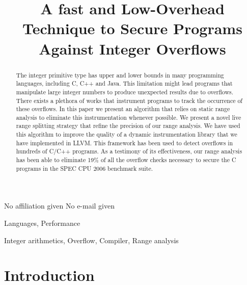 \documentclass[preprint]{sigplanconf}[10pt]
\begin{document}
\copyrightdata{[to be supplied]} 


\title{A fast and Low-Overhead Technique to Secure Programs Against
Integer Overflows}

           {No affiliation given}
           {No e-mail given}

\maketitle

\begin{abstract}
The integer primitive type has upper and lower bounds in many programming
languages, including C, C++ and Java.
This limitation might lead programs that manipulate large integer numbers to
produce unexpected results due to overflows.
There exists a plethora of works that instrument programs to track the occurrence
of these overflows.
In this paper we present an algorithm that relies on static range analysis to
eliminate this instrumentation whenever possible.
We present a novel live range splitting strategy that refine the precision of
our range analysis.
We have used this algorithm to improve the quality of a dynamic instrumentation
library that we have implemented in LLVM.
This framework has been used to detect overflows in hundreds of C/C++ programs.
As a testimony of its effectiveness, our range analysis has been able to eliminate
19\% of all the overflow checks necessary to secure the C programs in the
SPEC CPU 2006 benchmark suite.
\end{abstract}


\terms
Languages, Performance

\keywords
Integer arithmetics, Overflow, Compiler, Range analysis

\section{Introduction}
\label{sec:int}
\end{document}
